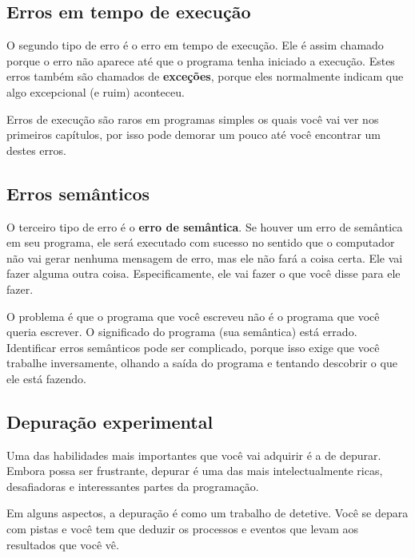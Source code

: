 \documentclass[10pt]{book}
\begin{document}
\subsection{Erros em tempo de execução}
\label{tempo de execução}

O segundo tipo de erro é o erro em tempo de execução. Ele é assim chamado porque o
erro não aparece até que o programa tenha iniciado a execução.
Estes erros também são chamados de {\bf exceções}, porque eles normalmente
indicam que algo excepcional (e ruim) aconteceu.

Erros de execução são raros em programas simples os quais você vai ver nos
primeiros capítulos, por isso pode demorar um pouco até você encontrar um destes erros.


\subsection{Erros semânticos}

O terceiro tipo de erro é o {\bf erro de semântica}. Se houver um
erro de semântica em seu programa, ele será executado com sucesso no sentido
que o computador não vai gerar nenhuma mensagem de erro, mas ele
não fará a coisa certa. Ele vai fazer alguma outra coisa. Especificamente, ele
vai fazer o que você disse para ele fazer.

O problema é que o programa que você escreveu não é o programa que você
queria escrever. O significado do programa (sua semântica) está errado.
Identificar erros semânticos pode ser complicado, porque isso exige que você trabalhe
inversamente, olhando a saída do programa e tentando descobrir
o que ele está fazendo.

\subsection{Depuração experimental}

Uma das habilidades mais importantes que você vai adquirir é a de depurar.
Embora possa ser frustrante, depurar é uma das
mais intelectualmente ricas, desafiadoras e interessantes partes da
programação.

Em alguns aspectos, a depuração é como um trabalho de detetive. Você se depara
com pistas e você tem que deduzir os processos e eventos que levam
aos resultados que você vê.
\end{document}
